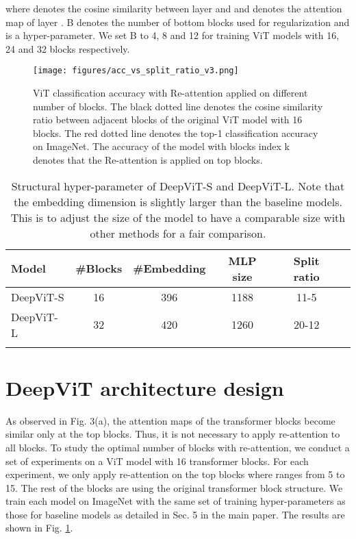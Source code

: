 \documentclass[10pt,twocolumn,letterpaper]{article}
\newcommand{\nameofatten}{Re-attention}
\begin{document}
 
where  denotes the cosine similarity between layer  and  and  denotes the attention map of layer . B denotes the number of bottom blocks used for regularization and is a hyper-parameter. We set B to 4, 8 and 12 for training ViT models with 16, 24 and 32 blocks respectively.


\begin{figure}[t]
\begin{center}
\texttt{[image: figures/acc\_vs\_split\_ratio\_v3.png]}
\end{center}
  \caption{ViT classification accuracy with \nameofatten{} applied on different number of blocks. The black dotted line denotes the cosine similarity ratio between adjacent blocks of the original ViT model with 16 blocks. The red dotted line denotes the top-1 classification accuracy on ImageNet. The accuracy of the model with blocks index k denotes that the \nameofatten{} is applied on top  blocks.}
\label{fig:supp_split_ratio}
\end{figure}

\begin{table}[h]
\footnotesize
\caption{Structural hyper-parameter of DeepViT-S and DeepViT-L. Note that the embedding dimension is slightly larger than the baseline models. This is to adjust the size of the model to have a comparable size with other methods for a fair comparison.}
\label{tab:supp_sota_comparison_arch}
\centering
\begin{tabular}{lccccc}
\toprule
\bf Model
&\bf \#Blocks
&\bf \#Embedding
&\bf MLP size
&\bf Split ratio
\\ \midrule DeepViT-S & 16 & 396 & 1188  & 11-5 \\
 DeepViT-L &  32 & 420 & 1260  & 20-12 \\ 
\bottomrule
\vspace{-5mm}
\end{tabular}
\end{table}

\section{DeepViT architecture design}
As observed in Fig. 3(a), the attention maps of the transformer blocks become similar only at the top blocks. Thus, it is not necessary to apply re-attention to all blocks. To study the optimal number of blocks with re-attention, we conduct a set of experiments on a ViT model with 16 transformer blocks. For each experiment, we only apply re-attention on the top  blocks where  ranges from 5 to 15. The rest of the blocks are using the original transformer block structure. We train each model on ImageNet with the same set of training hyper-parameters as those for baseline models as detailed in Sec. 5 in the main paper. The results are shown in Fig. \ref{fig:supp_split_ratio}. 
\end{document}
